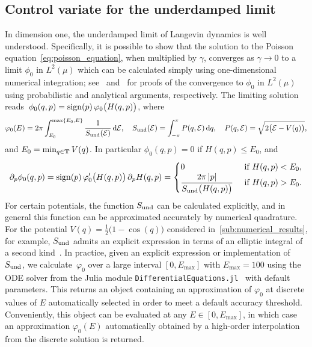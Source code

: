 \documentclass[11pt,a4paper]{article}
\begin{document}
\subsection{Control variate for the underdamped limit}%
\label{sub:underdamped_approach}
In dimension one,
the underdamped limit of Langevin dynamics is well understood.
Specifically, it is possible to show that the solution to the Poisson equation~\eqref{eq:poisson_equation},
when multiplied by $\gamma$,
converges as $\gamma \to 0$ to a limit $\phi_0$ in $L^2(\mu)$ which can be calculated simply using one-dimensional numerical integration;
see~\cite[Lemma 3.4]{MR2394704} and~\cite[Proposition 4.1]{roussel_thesis}
for proofs of the convergence to $\phi_0$ in $L^2(\mu)$ using probabilistic and analytical arguments,
respectively.
The limiting solution reads~$\phi_0(q,p) = \operatorname{sign}(p) \, \varphi_0\bigl(H(q,p)\bigr)$,
where
\[
    \varphi_0(E) = 2 \pi \int_{E_0}^{\max\{E_0, E\}} \frac{1}{S_{\rm und}(\mathcal E)} \, \mathrm d \mathcal E,
    \quad S_{\rm und}(\mathcal E) = \int_{-\pi}^{\pi} P(q, \mathcal E) \, \mathrm d q, \quad P(q, \mathcal E) = \sqrt {2 \bigl(\mathcal E - V(q)\bigr)},
\]
and $E_0 = \min_{q \in \mathbf T} V(q)$.
In particular $\phi_0(q,p) = 0$ if $H(q,p) \leq E_0$,
and
\[
    \partial_p \phi_0(q, p)
    = \sign(p) \, \varphi_0'\bigl(H(q,p)\bigr) \, \partial_p H(q,p)
    =
    \begin{cases}
        0 & \text{ if $H(q,p) < E_0$}, \\
        \displaystyle \frac{2 \pi \abs{p}}{S_{\rm und}\bigl(H(q,p)\bigr)} & \text{ if $H(q,p) > E_0$}.
    \end{cases}
\]
For certain potentials,
the function $S_{\rm und}$ can be calculated explicitly,
and in general this function can be approximated accurately by numerical quadrature.
For the potential $V(q) = \frac{1}{2} \bigl(1 - \cos(q)\bigr)$ considered in~\cref{sub:numerical_results},
for example, $S_{\rm und}$ admits an explicit expression in terms of an elliptic integral of a second kind~\cite{MR2427108}.
In practice, given an explicit expression or implementation of~$S_{\rm und}$,
we calculate~$\varphi_0$ over a large interval $[0, E_{\max}]$ with $E_{\max} = 100$
using the ODE solver from the Julia module \texttt{DifferentialEquations.jl}~\cite{rackauckas2017differentialequations} with default parameters.
This returns an object containing an approximation of $\varphi_0$ at discrete values of $E$ automatically selected in order to meet a default accuracy threshold.
Conveniently, this object can be evaluated at any $E \in [0, E_{\max}]$,
in which case an approximation $\varphi_0(E)$ automatically obtained by a high-order interpolation from the discrete solution is returned.
\end{document}
